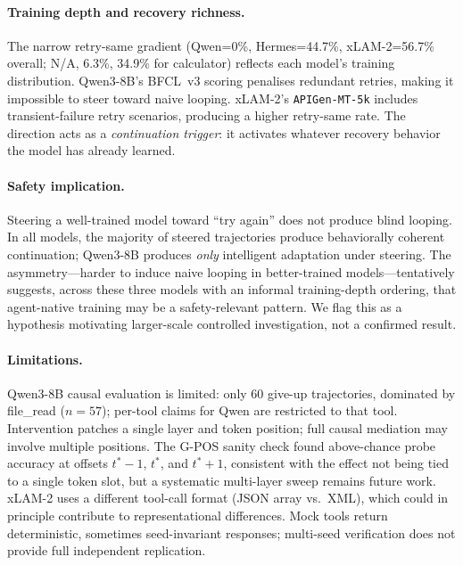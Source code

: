 \documentclass{article}
\begin{document}
\paragraph{Training depth and recovery richness.}
The narrow retry-same gradient (Qwen=0\%, Hermes=44.7\%,
xLAM-2=56.7\% overall; N/A, 6.3\%, 34.9\% for calculator) reflects
each model's training distribution.
Qwen3-8B's BFCL~v3 scoring penalises redundant retries, making it
impossible to steer toward naive looping.
xLAM-2's \texttt{APIGen-MT-5k} includes transient-failure retry
scenarios, producing a higher retry-same rate.
The direction acts as a \emph{continuation trigger}: it activates
whatever recovery behavior the model has already learned.

\paragraph{Safety implication.}
Steering a well-trained model toward ``try again'' does not produce
blind looping.  In all models, the majority of steered trajectories
produce behaviorally coherent continuation; Qwen3-8B produces
\emph{only} intelligent adaptation under steering.
The asymmetry---harder to induce naive looping in better-trained
models---tentatively suggests, across these three models with an
informal training-depth ordering, that agent-native training may
be a safety-relevant pattern. We flag this as a hypothesis motivating
larger-scale controlled investigation, not a confirmed result.

\paragraph{Limitations.}
Qwen3-8B causal evaluation is limited: only 60 give-up trajectories,
dominated by file\_read ($n{=}57$); per-tool claims for Qwen are
restricted to that tool.
Intervention patches a single layer and token position; full causal
mediation may involve multiple positions. The G-POS sanity check found
above-chance probe accuracy at offsets $t^*{-}1$, $t^*$, and
$t^*{+}1$, consistent with the effect not being tied to a single
token slot, but a systematic multi-layer sweep remains future work.
xLAM-2 uses a different tool-call format (JSON array vs.\ XML), which
could in principle contribute to representational differences.
Mock tools return deterministic, sometimes seed-invariant responses;
multi-seed verification does not provide full independent replication.

\end{document}
